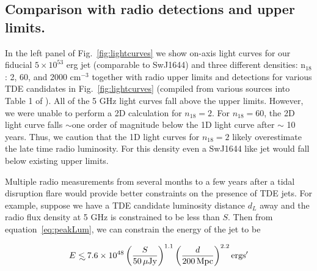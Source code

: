 \documentclass[usenatbib,fleqn]{mnras}
\newcommand\lsim{\mathrel{\rlap{\lower4pt\hbox{\hskip1pt$\sim$}}
    \raise1pt\hbox{$<$}}}
\begin{document}


\subsection{Comparison with radio detections and upper limits.}

In the left panel of Fig.~\ref{fig:lightcurves} we show on-axis light
curves for our fiducial $5\times 10^{53}$ erg jet (comparable to
SwJ1644) and three different densities: n$_{18}$: 2, 60, and 2000
cm$^{-3}$ together with radio upper limits and detections for various
TDE candidates in Fig.~\ref{fig:lightcurves} (compiled from various
sources into Table 1 of \citealt{Mimica+2015}).  All of the 5 GHz
light curves fall above the upper limits. However, we were unable to
perform a 2D calculation for $n_{18}=2$.  For $n_{18}=60$, the 2D
light curve falls $\sim$one order of magnitude below the 1D light
curve after $\sim$ 10 years. Thus, we caution that the 1D light curves
for $n_{18}=2$ likely overestimate the late time radio luminosity. For
this density even a SwJ1644 like jet would fall below existing upper
limits. 

Multiple radio measurements from several months to a few years after a
tidal disruption flare would provide better constraints on the
presence of TDE jets. For example, suppose we have a TDE candidate
luminosity distance $d_L$ away and the radio flux density at 5 GHz is
constrained to be less than $S$. Then from equation~\eqref{eq:peakLum},
we can constrain the energy of the jet to be

\begin{equation}
E\lsim 7.6 \times 10^{48} \left(\frac{S}{50 \,\mu{\rm Jy}}\right)^{1.1}
  \left(\frac{d}{200 \,{\rm Mpc}}\right)^{2.2} {\rm ergs}'
\end{equation}
\end{document}

